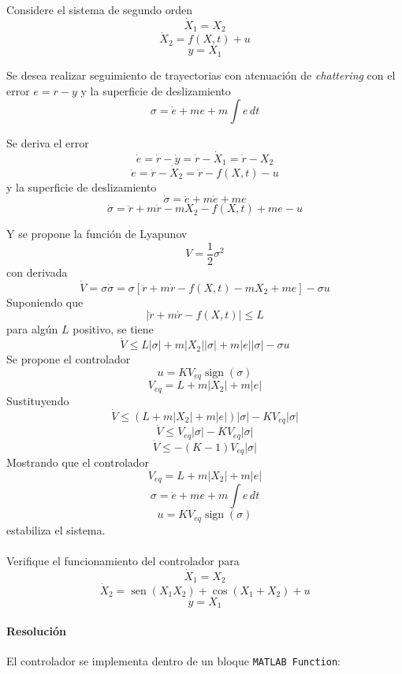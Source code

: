\clearpage
\begin{flushright}
\end{flushright}

Considere el sistema de segundo orden
\[
  \dot{X}_1=X_2
\]
\[
  \dot{X}_2=f(X,t)+u
\]
\[
  y=X_1
\]

Se desea realizar seguimiento de trayectorias con atenuación de
\textit{chattering} con el error $e=r-y$ y la superficie de deslizamiento
\[
  \sigma=\dot{e}+me+m\int e\,dt
\]

Se deriva el error
\[
  \dot{e}=\dot{r}-\dot{y}=\dot{r}-\dot{X}_1=\dot{r}-X_2
\]
\[
  \ddot{e}=\ddot{r}-\dot{X}_2=\ddot{r}-f(X,t)-u
\]
y la superficie de deslizamiento
\[
  \dot{\sigma}=\ddot{e}+m\dot{e}+me
\]
\[
  \dot{\sigma}=\ddot{r}+m\dot{r}-mX_2-f(X,t)+me-u
\]

Y se propone la función de Lyapunov
\[
  V=\frac{1}{2}\sigma^2
\]
con derivada
\[
  \dot{V}=\sigma\dot{\sigma}
  =\sigma\left[\ddot{r}+m\dot{r}-f(X,t)-mX_2+me\right]-\sigma u
\]
Suponiendo que
\[
  \left\lvert\ddot{r}+m\dot{r}-f(X,t)\right\rvert\leq L
\]
para algún $L$ positivo, se tiene
\[
  \dot{V}\leq L\lvert\sigma\rvert
  +m\lvert X_2\rvert\lvert\sigma\rvert
  +m\lvert e\rvert\lvert\sigma\rvert-\sigma u
\]
Se propone el controlador
\[
  u=K V_{eq}\operatorname{sign}(\sigma)
\]
\[
  V_{eq}=L+m\lvert X_2\rvert+m\lvert e\rvert
\]
Sustituyendo
\[
  \dot{V}\leq
  \left(L+m\lvert X_2\rvert+m\lvert e\rvert\right)
  \lvert\sigma\rvert-KV_{eq}\lvert\sigma\rvert
\]
\[
  \dot{V}\leq V_{eq}\lvert\sigma\rvert
  -KV_{eq}\lvert\sigma\rvert
\]
\[
  \dot{V}\leq-(K-1)V_{eq}\lvert\sigma\rvert
\]
Mostrando que el controlador
\[
  V_{eq}=L+m\lvert X_2\rvert+m\lvert e\rvert
\]
\[
  \sigma=\dot{e}+me+m\int e\,dt
\]
\[
  u=KV_{eq}\operatorname{sign}(\sigma)
\]
estabiliza el sistema.

\paragraph{}
Verifique el funcionamiento del controlador para
\[
  \dot{X}_1=X_2
\]
\[
  \dot{X}_2=\operatorname{sen}(X_1X_2)+\cos(X_1+X_2)+u
\]
\[
  y=X_1
\]

\paragraph{Resolución}

El controlador se implementa dentro de un bloque \texttt{MATLAB Function}:


